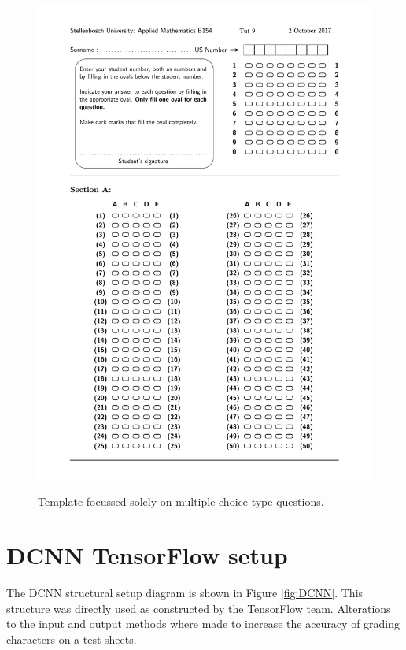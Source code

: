 \begin{figure}
  \centering
  \includegraphics[width=12cm]{template3}\\
  \caption{Template focussed solely on multiple choice type questions.}
  \label{fig:template3}
\end{figure}

\section{DCNN TensorFlow setup}
The DCNN structural setup diagram is shown in Figure \ref{fig:DCNN}. This structure was directly used as constructed by the TensorFlow team. Alterations to the input and output methods where made to increase the accuracy of grading characters on a test sheets.

